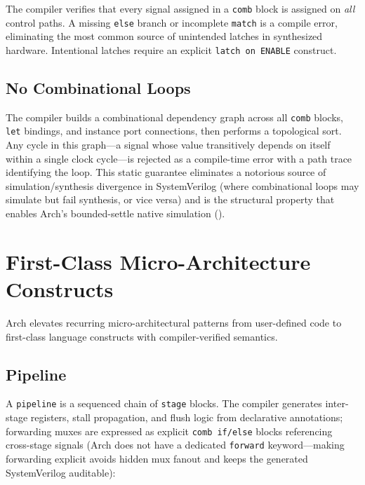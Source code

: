 \documentclass[manuscript]{acmart}
\begin{document}
The compiler verifies that every signal assigned in a \texttt{comb} block is assigned on \emph{all} control paths. A missing \texttt{else} branch or incomplete \texttt{match} is a compile error, eliminating the most common source of unintended latches in synthesized hardware. Intentional latches require an explicit \texttt{latch on ENABLE} construct.

\subsection{No Combinational Loops}

The compiler builds a combinational dependency graph across all \texttt{comb} blocks, \texttt{let} bindings, and instance port connections, then performs a topological sort. Any cycle in this graph---a signal whose value transitively depends on itself within a single clock cycle---is rejected as a compile-time error with a path trace identifying the loop. This static guarantee eliminates a notorious source of simulation/synthesis divergence in SystemVerilog (where combinational loops may simulate but fail synthesis, or vice versa) and is the structural property that enables Arch's bounded-settle native simulation ().

\section{First-Class Micro-Architecture Constructs}\label{sec:constructs}

Arch elevates recurring micro-architectural patterns from user-defined code to first-class language constructs with compiler-verified semantics.

\subsection{Pipeline}

A \texttt{pipeline} is a sequenced chain of \texttt{stage} blocks. The compiler generates inter-stage registers, stall propagation, and flush logic from declarative annotations; forwarding muxes are expressed as explicit \texttt{comb if/else} blocks referencing cross-stage signals (Arch does not have a dedicated \texttt{forward} keyword---making forwarding explicit avoids hidden mux fanout and keeps the generated SystemVerilog auditable):
\end{document}
